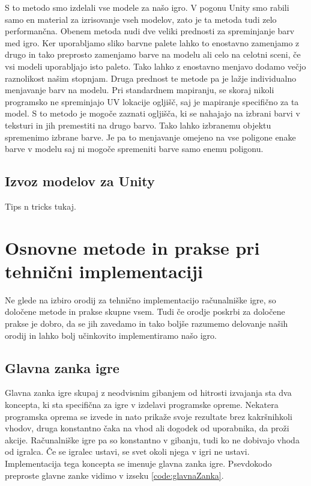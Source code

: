 \documentclass[12pt,a4paper,twoside]{book}
\begin{document}
S to metodo smo izdelali vse modele za našo igro. V pogonu Unity smo rabili samo en material za izrisovanje vseh modelov, zato je ta metoda tudi zelo performančna. Obenem metoda nudi dve veliki prednosti za spreminjanje barv med igro. Ker uporabljamo sliko barvne palete lahko to enostavno zamenjamo z drugo in tako preprosto zamenjamo barve na modelu ali celo na celotni sceni, če vsi modeli uporabljajo isto paleto. Tako lahko z enostavno menjavo dodamo večjo raznolikost našim stopnjam. Druga prednost te metode pa je lažje individualno menjavanje barv na modelu. Pri standardnem mapiranju, se skoraj nikoli programsko ne spreminjajo UV lokacije ogljišč, saj je mapiranje specifično za ta model. S to metodo je mogoče zaznati ogljišča, ki se nahajajo na izbrani barvi v teksturi in jih premestiti na drugo barvo. Tako lahko izbranemu objektu spremenimo izbrane barve. Je pa to menjavanje omejeno na vse poligone enake barve v modelu saj ni mogoče spremeniti barve samo enemu poligonu.

\subsection{Izvoz modelov za Unity}
Tips n tricks tukaj.

\section{Osnovne metode in prakse pri tehnični implementaciji}
Ne glede na izbiro orodij za tehnično implementacijo računalniške igre, so določene metode in prakse skupne vsem. Tudi če orodje poskrbi za določene prakse je dobro, da se jih zavedamo in tako boljše razumemo delovanje naših orodij in lahko bolj učinkovito implementiramo našo igro.

\subsection{Glavna zanka igre}
Glavna zanka igre skupaj z neodvisnim gibanjem od hitrosti izvajanja sta dva koncepta, ki sta specifična za igre v izdelavi programske opreme. Nekatera programska oprema se izvede in nato prikaže svoje rezultate brez kakršnihkoli vhodov, druga konstantno čaka na vhod ali dogodek od uporabnika, da proži akcije. Računalniške igre pa so konstantno v gibanju, tudi ko ne dobivajo vhoda od igralca. Če se igralec ustavi, se svet okoli njega v igri ne ustavi. Implementacija tega koncepta se imenuje glavna zanka igre. Psevdokodo preproste glavne zanke vidimo v izseku \ref{code:glavnaZanka}.
\end{document}
